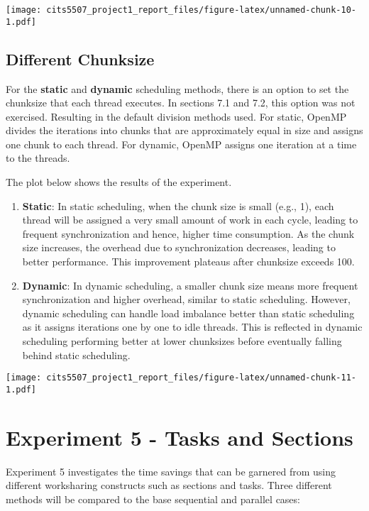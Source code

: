 \documentclass[
]{article}
\begin{document}
\texttt{[image: cits5507\_project1\_report\_files/figure-latex/unnamed-chunk-10-1.pdf]}

\hypertarget{different-chunksize}{%
\subsection{Different Chunksize}\label{different-chunksize}}

For the \textbf{static} and \textbf{dynamic} scheduling methods, there
is an option to set the chunksize that each thread executes. In sections
7.1 and 7.2, this option was not exercised. Resulting in the default
division methods used. For static, OpenMP divides the iterations into
chunks that are approximately equal in size and assigns one chunk to
each thread. For dynamic, OpenMP assigns one iteration at a time to the
threads.

The plot below shows the results of the experiment.

\begin{enumerate}
\def\labelenumi{\arabic{enumi}.}
\item
  \textbf{Static}: In static scheduling, when the chunk size is small
  (e.g., 1), each thread will be assigned a very small amount of work in
  each cycle, leading to frequent synchronization and hence, higher time
  consumption. As the chunk size increases, the overhead due to
  synchronization decreases, leading to better performance. This
  improvement plateaus after chunksize exceeds 100.
\item
  \textbf{Dynamic}: In dynamic scheduling, a smaller chunk size means
  more frequent synchronization and higher overhead, similar to static
  scheduling. However, dynamic scheduling can handle load imbalance
  better than static scheduling as it assigns iterations one by one to
  idle threads. This is reflected in dynamic scheduling performing
  better at lower chunksizes before eventually falling behind static
  scheduling.
\end{enumerate}

\texttt{[image: cits5507\_project1\_report\_files/figure-latex/unnamed-chunk-11-1.pdf]}

\hypertarget{experiment-5---tasks-and-sections}{%
\section{Experiment 5 - Tasks and
Sections}\label{experiment-5---tasks-and-sections}}

Experiment 5 investigates the time savings that can be garnered from
using different worksharing constructs such as sections and tasks. Three
different methods will be compared to the base sequential and parallel
cases:
\end{document}
